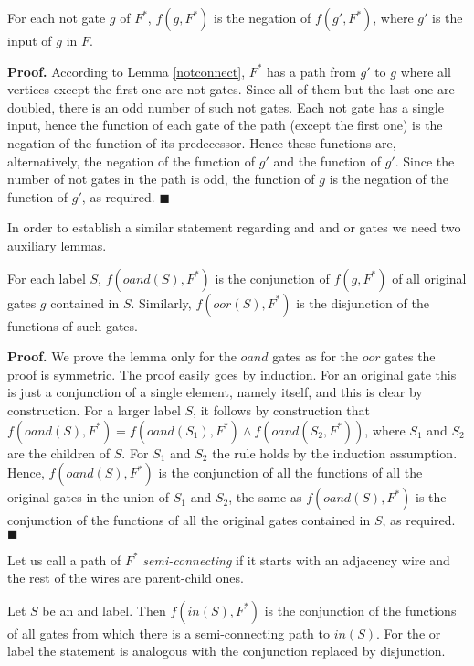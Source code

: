 \documentclass{llncs}
\begin{document}
\begin{lemma} \label{notfunction}
For each {\sc not} gate $g$ of $F^*$, $f(g,F^*)$ is the negation of $f(g',F^*)$, where $g'$ is the input
of $g$ in $F$.
\end{lemma}

{\bf Proof.}
According to Lemma \ref{notconnect}, $F^*$ has a path from 
$g'$ to $g$ where all vertices except the first one are {\sc not} gates.
Since all of them but the last one are doubled, there is an odd number of such {\sc not} gates. Each {\sc not} gate has 
a single input, hence the function of each gate of the path (except the first one) is the negation of the function of its predecessor.
Hence these functions are, alternatively, the negation of the function of $g'$ and the function of $g'$. Since the number of 
{\sc not} gates in the path is odd, the function of $g$ is the negation of the function of $g'$, as required. $\blacksquare$

In order to establish a similar statement regarding {\sc and} and {\sc or} gates we need two auxiliary lemmas.

\begin{lemma} \label{childparentconnect}
For each label $S$, $f(oand(S),F^*)$ is the conjunction of
$f(g,F^*)$ of all original gates $g$ contained in $S$. Similarly, $f(oor(S),F^*)$ is the disjunction of the functions of such gates.
\end{lemma}

{\bf Proof.} 
We prove the lemma only for the $oand$ gates as for the $oor$ gates the proof is symmetric.
The proof easily goes by induction. For an original gate this is just a conjunction of a single element, namely itself, and 
this is clear by construction. For a larger label $S$, it follows by construction that $f(oand(S),F^*)=
f(oand(S_1),F^*) \wedge f(oand(S_2,F^*))$, where $S_1$ and $S_2$ are the children of $S$. For $S_1$ and $S_2$ the
rule holds by the induction assumption. Hence, $f(oand(S),F^*)$ is the conjunction of all the functions of all the original gates in the union of $S_1$ and $S_2$, the same as $f(oand(S),F^*)$ is the conjunction of the functions of all the original gates contained in $S$, as required.
$\blacksquare$

Let us call a path of $F^*$ \emph{semi-connecting} if it starts with an adjacency wire and the rest of the wires are parent-child ones.

\begin{lemma} \label{semiconnect}
Let $S$ be an {\sc and} label. Then $f(in(S),F^*)$ is the conjunction of the functions of all gates from which there is a semi-connecting path to $in(S)$.
For the {\sc or} label the statement is analogous with the conjunction replaced by disjunction.
\end{lemma}
\end{document}
